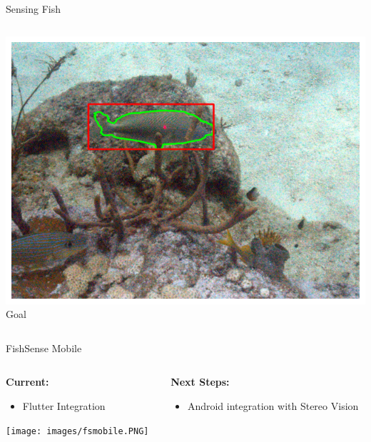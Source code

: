 \begin{frame}{Sensing Fish}
\begin{columns}
\begin{column}{0.33\textwidth}
            \includegraphics[width=\linewidth,keepaspectratio]{images/ideal.png}
            {\small Goal}
        \end{column}
    \end{columns}
\end{frame}

\begin{frame}{FishSense Mobile}
    \begin{columns}
        \begin{column}{0.5\textwidth}
            \textbf{Current:}
            \begin{itemize}
                \item Flutter Integration
            \end{itemize}
            \vspace{0.5em}
            \centering
            \texttt{[image: images/fsmobile.PNG]}
        \end{column}
        \begin{column}{0.5\textwidth}
            \textbf{Next Steps:}
            \begin{itemize}
                \item Android integration with Stereo Vision
            \end{itemize}
        \end{column}
    \end{columns}
\end{frame}
